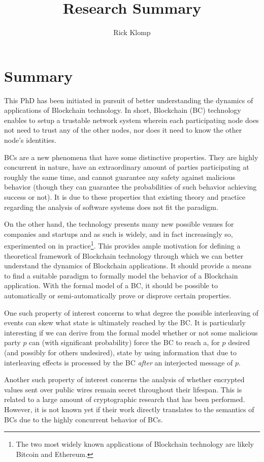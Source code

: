 \documentclass[]{article}
\title{Research Summary}
\author{Rick Klomp}
\begin{document}
\maketitle

\section{Summary}
This PhD has been initiated in pursuit of better understanding the dynamics of applications of Blockchain technology. In short, Blockchain (BC) technology enables to setup a trustable network system wherein each participating node does not need to trust any of the other nodes, nor does it need to know the other node's identities.

BCs are a new phenomena that have some distinctive properties. They are highly concurrent in nature, have an extraordinary amount of parties participating at roughly the same time, and cannot guarantee any safety against malicious behavior (though they can guarantee the probabilities of such behavior achieving success or not). It is due to these properties that existing theory and practice regarding the analysis of software systems does not fit the paradigm.

On the other hand, the technology presents many new possible venues for companies and startups and as such is widely, and in fact increasingly so, experimented on in practice\footnote{
	The two most widely known applications of Blockchain technology are likely Bitcoin and Ethereum.
}. This provides ample motivation for defining a theoretical framework of Blockchain technology through which we can better understand the dynamics of Blockchain applications. It should provide a means to find a suitable paradigm to formally model the behavior of a Blockchain application. With the formal model of a BC, it should be possible to automatically or semi-automatically prove or disprove certain properties. 

One such property of interest concerns to what degree the possible interleaving of events can skew what state is ultimately reached by the BC. It is particularly interesting if we can derive from the formal model whether or not some malicious party $p$ can (with significant probability) force the BC to reach a, for $p$ desired (and possibly for others undesired), state by using information that due to interleaving effects is processed by the BC \emph{after} an interjected message of $p$.

Another such property of interest concerns the analysis of whether encrypted values sent over public wires remain secret throughout their lifespan. This is related to a large amount of cryptographic research that has been performed. However, it is not known yet if their work directly translates to the semantics of BCs due to the highly concurrent behavior of BCs.
\end{document}

